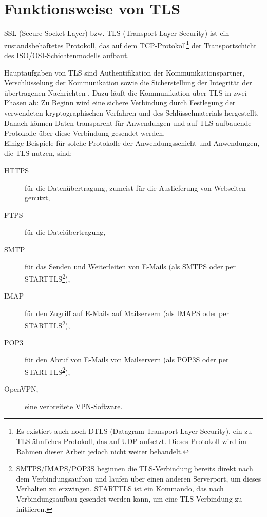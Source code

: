 \lstset{style=tls}

\chapter{Funktionsweise von TLS}
\label{sec_tls_overview}

SSL (Secure Socket Layer) bzw. TLS (Transport Layer Security) ist ein zustandsbehaftetes Protokoll, das auf dem TCP-Protokoll\footnote{
	Es existiert auch noch DTLS (Datagram Transport Layer Security), ein zu TLS ähnliches Protokoll, das auf UDP aufsetzt. Dieses Protokoll wird im Rahmen dieser Arbeit jedoch nicht weiter behandelt.
} der Transportschicht des ISO/OSI-Schichtenmodells aufbaut. 

Hauptaufgaben von TLS sind Authentifikation der Kommunikationspartner, Verschlüsselung der Kommunikation sowie die Sicherstellung der Integrität der übertragenen Nachrichten \cite{meyer14}. Dazu läuft die Kommunikation über TLS in zwei Phasen ab: Zu Beginn wird eine sichere Verbindung durch Festlegung der verwendeten kryptographischen Verfahren und des Schlüsselmaterials hergestellt. Danach können Daten transparent für Anwendungen und auf TLS aufbauende Protokolle über diese Verbindung gesendet werden.\\
Einige Beispiele für solche Protokolle der Anwendungsschicht und Anwendungen, die TLS nutzen, sind:
\begin{description}
\item[HTTPS] für die Datenübertragung, zumeist für die Auslieferung von Webseiten genutzt, 
\item[FTPS] für die Dateiübertragung,
\item[SMTP] für das Senden und Weiterleiten von E-Mails (als SMTPS oder per STARTTLS\footnote{\label{fn_starttls}
	SMTPS/IMAPS/POP3S beginnen die TLS-Verbindung bereits direkt nach dem Verbindungsaufbau und laufen über einen anderen Serverport, um dieses Verhalten zu erzwingen. STARTTLS ist ein Kommando, das nach Verbindungsaufbau gesendet werden kann, um eine TLS-Verbindung zu initiieren.}),
\item[IMAP] für den Zugriff auf E-Mails auf Mailservern (als IMAPS oder per STARTTLS\textsuperscript{\ref{fn_starttls}}),
\item[POP3] für den Abruf von E-Mails von Mailservern (als POP3S oder per STARTTLS\textsuperscript{\ref{fn_starttls}}),
\item[OpenVPN,] eine verbreitete VPN-Software.
\end{description}


